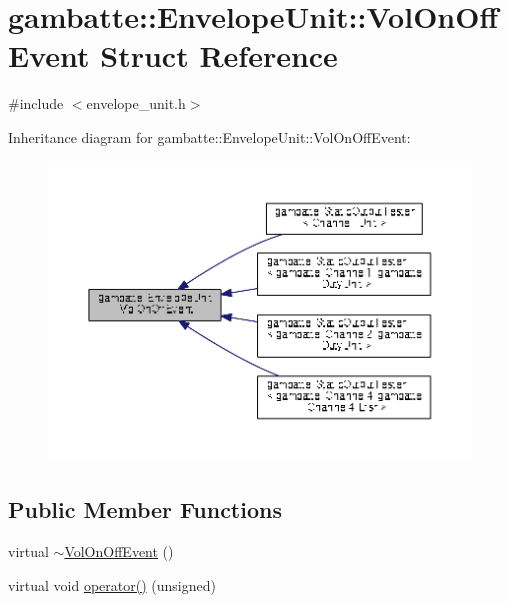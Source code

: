 \hypertarget{structgambatte_1_1EnvelopeUnit_1_1VolOnOffEvent}{}\section{gambatte\+:\+:Envelope\+Unit\+:\+:Vol\+On\+Off\+Event Struct Reference}
\label{structgambatte_1_1EnvelopeUnit_1_1VolOnOffEvent}


{\ttfamily \#include $<$envelope\+\_\+unit.\+h$>$}



Inheritance diagram for gambatte\+:\+:Envelope\+Unit\+:\+:Vol\+On\+Off\+Event\+:
\nopagebreak
\begin{figure}[H]
\begin{center}
\leavevmode
\includegraphics[width=350pt]{structgambatte_1_1EnvelopeUnit_1_1VolOnOffEvent__inherit__graph}
\end{center}
\end{figure}
\subsection*{Public Member Functions}
\begin{DoxyCompactItemize}
\item 
virtual \hyperlink{structgambatte_1_1EnvelopeUnit_1_1VolOnOffEvent_aa13ce56855180826b6524b6c23beaa87}{$\sim$\+Vol\+On\+Off\+Event} ()
\item 
virtual void \hyperlink{structgambatte_1_1EnvelopeUnit_1_1VolOnOffEvent_a51a53f7c8e454be01a67e82a33dcf5ee}{operator()} (unsigned)
\end{DoxyCompactItemize}



